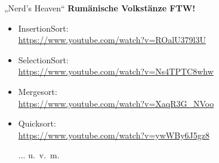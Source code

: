 \begin{frame}{{}„Nerd's Heaven“{}}
	\pause  %
	\textbf{Rumänische Volkstänze FTW!} \\\pause
	\begin{itemize}
		\item InsertionSort: \\
		\url{https://www.youtube.com/watch?v=ROalU379l3U} 
		\item SelectionSort: \\
		\url{https://www.youtube.com/watch?v=Ns4TPTC8whw} 
		\item Mergesort: \\
		\url{https://www.youtube.com/watch?v=XaqR3G\_NVoo} 
		\item Quicksort: \\
		\url{https://www.youtube.com/watch?v=ywWBy6J5gz8} 
		\item[...] u.~v.~m.
	\end{itemize}
	
\end{frame}



